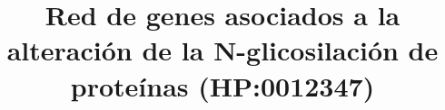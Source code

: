 \documentclass{bmcart}
\begin{document}
	\begin{frontmatter}
	
		\begin{fmbox}
			
			
			\title{Red de genes asociados a la alteración de la N-glicosilación de proteínas (HP:0012347)}
			
			
			\author[addressref={aff1}]{}
			\author[addressref={aff1}]{}
			\author[addressref={aff1}]{}
			\author[addressref={aff1}]{}
			
			
			\address[id=aff1]{%
			  ,             %
			  ,          %
			  ,                              %
			}
		
		\end{fmbox}%
		
		\begin{abstractbox}
			\begin{abstract}
			

\end{abstract}
\end{abstractbox}
\end{frontmatter}
\end{document}
